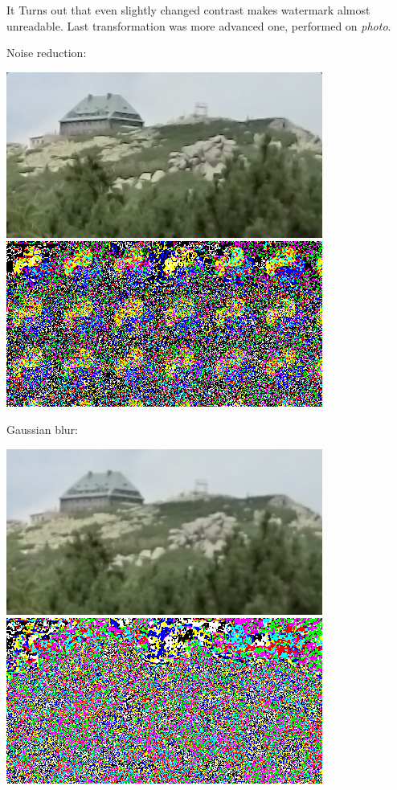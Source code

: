 \documentclass[a4paper, 12pt]{article}
\begin{document}
    	It Turns out that even slightly changed contrast makes watermark almost unreadable. Last transformation was more advanced one, performed on \textit{photo}.

    	Noise reduction:

    	\includegraphics[scale=0.6]{photo_lsb/watermarked_photo_reduction.png}
    	\includegraphics[scale=0.6]{photo_lsb/watermark_watermarked_photo_reduction.png}

    	Gaussian blur:

    	\includegraphics[scale=0.6]{photo_lsb/watermarked_photo_gaus.png}
    	\includegraphics[scale=0.6]{photo_lsb/watermark_watermarked_photo_gaus.png}
\end{document}
